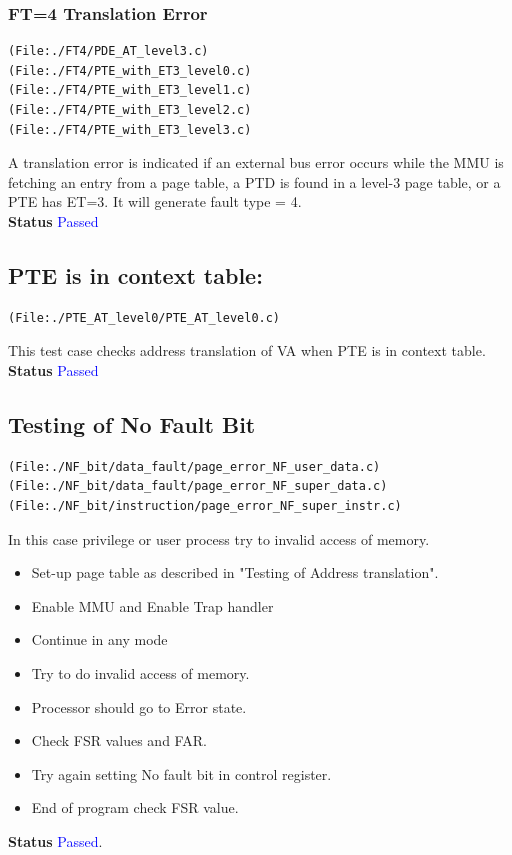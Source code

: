 \documentclass[12pt,a4paper]{article}
\begin{document}
\subsubsection{ FT=4 Translation Error}
\begin{lstlisting}
(File:./FT4/PDE_AT_level3.c)
(File:./FT4/PTE_with_ET3_level0.c)
(File:./FT4/PTE_with_ET3_level1.c)
(File:./FT4/PTE_with_ET3_level2.c)
(File:./FT4/PTE_with_ET3_level3.c)
\end{lstlisting}
A translation error is indicated if an external bus error occurs while the MMU is fetching an entry from a page table, a PTD is found in a level-3 page table, or a PTE has ET=3. It will generate fault type = 4.\\
\textbf{Status} \textcolor{blue}{Passed}

\subsection{PTE is in context table: }
\begin{lstlisting}
(File:./PTE_AT_level0/PTE_AT_level0.c)
\end{lstlisting}
This test case checks address translation of VA when PTE is in context table.\\
\textbf{Status} \textcolor{blue}{Passed}

\subsection{Testing of No Fault Bit}
\begin{lstlisting}
(File:./NF_bit/data_fault/page_error_NF_user_data.c)
(File:./NF_bit/data_fault/page_error_NF_super_data.c)
(File:./NF_bit/instruction/page_error_NF_super_instr.c)
\end{lstlisting}
In this case privilege or user process try to invalid access of memory. 

\begin{itemize}
\item Set-up page table as described in "Testing of Address translation". 
\item Enable MMU and Enable Trap handler
\item Continue in any mode 
\item Try to do invalid access of memory. 
\item Processor should go to Error state. 
\item Check FSR values and FAR.
\item Try again setting No fault bit in control register.
\item End of program check FSR value.
\end{itemize}
\textbf{Status} \textcolor{blue}{Passed}.
\end{document}
